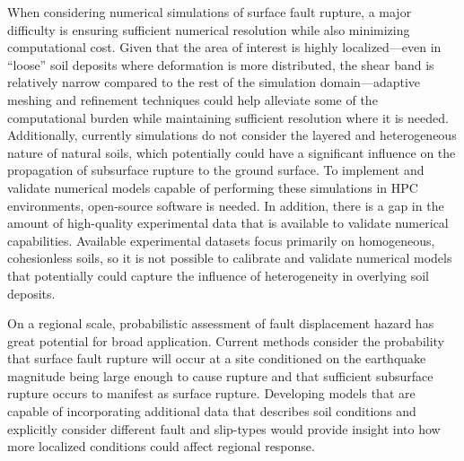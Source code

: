 
When considering numerical simulations of surface fault rupture, a major difficulty is ensuring sufficient numerical resolution while also minimizing computational cost. Given that the area of interest is highly localized---even in ``loose'' soil deposits where deformation is more distributed, the shear band is relatively narrow compared to the rest of the simulation domain---adaptive meshing and refinement techniques could help alleviate some of the computational burden while maintaining sufficient resolution where it is needed. Additionally, currently simulations do not consider the layered and heterogeneous nature of natural soils, which potentially could have a significant influence on the propagation of subsurface rupture to the ground surface. To implement and validate numerical models capable of performing these simulations in HPC environments, open-source software is needed. In addition, there is a gap in the amount of high-quality experimental data that is available to validate numerical capabilities. Available experimental datasets focus primarily on homogeneous, cohesionless soils, so it is not possible to calibrate and validate numerical models that potentially could capture the influence of heterogeneity in overlying soil deposits.

On a regional scale, probabilistic assessment of fault displacement hazard has great potential for broad application. Current methods consider the probability that surface fault rupture will occur at a site conditioned on the earthquake magnitude being large enough to cause rupture and that sufficient subsurface rupture occurs to manifest as surface rupture. Developing models that are capable of incorporating additional data that describes soil conditions and explicitly consider different fault and slip-types would provide insight into how more localized conditions could affect regional response.


